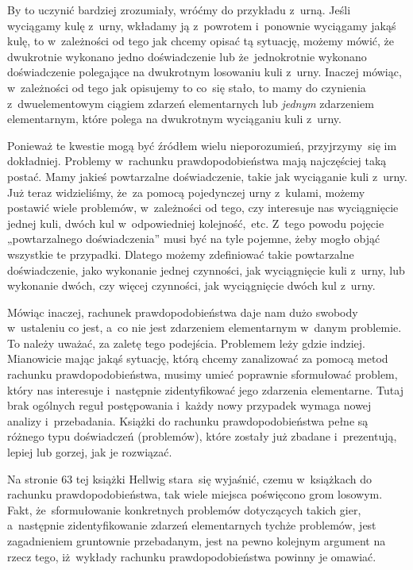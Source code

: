 \documentclass[a4paper,11pt]{article}
\numberwithin{equation}{section}
\begin{document}
By to uczynić bardziej zrozumiały, wróćmy do przykładu z~urną. Jeśli
wyciągamy kulę z~urny, wkładamy ją z~powrotem
i~ponownie wyciągamy jakąś kulę, to w~zależności od tego jak chcemy opisać
tą sytuację, możemy mówić, że dwukrotnie wykonano jedno doświadczenie lub
że~jednokrotnie wykonano doświadczenie polegające na dwukrotnym losowaniu
kuli z~urny. Inaczej mówiąc, w~zależności od tego jak opisujemy to co~się
stało, to mamy do czynienia z~dwuelementowym ciągiem zdarzeń elementarnych
lub \textit{jednym} zdarzeniem elementarnym, które polega na dwukrotnym
wyciąganiu kuli z~urny.

Ponieważ te kwestie mogą być źródłem wielu nieporozumień, przyjrzymy~się
im dokładniej. Problemy w~rachunku prawdopodobieństwa mają najczęściej taką
postać. Mamy jakieś powtarzalne doświadczenie, takie jak wyciąganie kuli
z~urny. Już teraz widzieliśmy, że~za pomocą pojedynczej urny z~kulami, możemy
postawić wiele problemów, w~zależności od tego, czy interesuje nas
wyciągnięcie jednej kuli, dwóch kul w~odpowiedniej kolejność,~etc. Z~tego
powodu pojęcie „powtarzalnego doświadczenia” musi być na tyle pojemne,
żeby mogło objąć wszystkie te przypadki. Dlatego możemy zdefiniować takie
powtarzalne doświadczenie, jako wykonanie jednej czynności, jak wyciągnięcie
kuli z~urny, lub wykonanie dwóch, czy więcej czynności, jak wyciągnięcie
dwóch kul z~urny.

Mówiąc inaczej, rachunek prawdopodobieństwa daje nam dużo swobody w~ustaleniu
co jest, a~co nie jest zdarzeniem elementarnym w~danym problemie. To należy
uważać, za zaletę tego podejścia. Problemem leży gdzie indziej. Mianowicie
mając jakąś sytuację, którą chcemy zanalizować za pomocą metod rachunku
prawdopodobieństwa, musimy umieć poprawnie sformułować problem, który
nas interesuje i~następnie zidentyfikować jego zdarzenia elementarne.
Tutaj brak ogólnych reguł postępowania i~każdy nowy przypadek wymaga nowej
analizy i~przebadania. Książki do rachunku prawdopodobieństwa pełne są
różnego typu doświadczeń (problemów), które zostały już zbadane
i~prezentują, lepiej lub gorzej, jak je rozwiązać.

Na stronie $63$ tej książki Hellwig stara~się wyjaśnić, czemu w~książkach
do rachunku prawdopodobieństwa, tak wiele miejsca poświęcono grom losowym.
Fakt, że~sformułowanie konkretnych problemów dotyczących takich gier,
a~następnie zidentyfikowanie zdarzeń elementarnych tychże problemów, jest
zagadnieniem gruntownie przebadanym, jest na pewno kolejnym argument na
rzecz tego, iż~wykłady rachunku prawdopodobieństwa powinny je omawiać.
\end{document}
